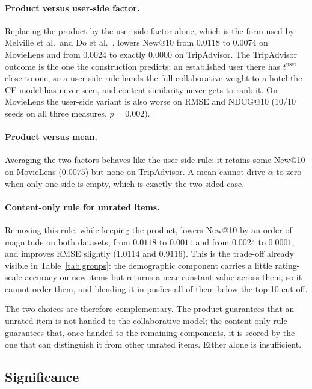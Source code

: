 \documentclass[runningheads]{llncs}
\begin{document}
\paragraph{Product versus user-side factor.} Replacing the product by the user-side factor alone, which is the form used by Melville et al.\ and Do et al.~\cite{melville2002,do2020}, lowers New@10 from $0.0118$ to $0.0074$ on MovieLens and from $0.0024$ to exactly $0.0000$ on TripAdvisor. The TripAdvisor outcome is the one the construction predicts: an established user there has $t^{\mathrm{user}}$ close to one, so a user-side rule hands the full collaborative weight to a hotel the CF model has never seen, and content similarity never gets to rank it. On MovieLens the user-side variant is also worse on RMSE and NDCG@10 (10/10 seeds on all three measures, $p = 0.002$).

\paragraph{Product versus mean.} Averaging the two factors behaves like the user-side rule: it retains some New@10 on MovieLens ($0.0075$) but none on TripAdvisor. A mean cannot drive $\alpha$ to zero when only one side is empty, which is exactly the two-sided case.

\paragraph{Content-only rule for unrated items.} Removing this rule, while keeping the product, lowers New@10 by an order of magnitude on both datasets, from $0.0118$ to $0.0011$ and from $0.0024$ to $0.0001$, and improves RMSE slightly ($1.0114$ and $0.9116$). This is the trade-off already visible in Table~\ref{tab:groups}: the demographic component carries a little rating-scale accuracy on new items but returns a near-constant value across them, so it cannot order them, and blending it in pushes all of them below the top-10 cut-off.

The two choices are therefore complementary. The product guarantees that an unrated item is not handed to the collaborative model; the content-only rule guarantees that, once handed to the remaining components, it is scored by the one that can distinguish it from other unrated items. Either alone is insufficient.

\subsection{Significance}
\label{sec:significance}
\end{document}
